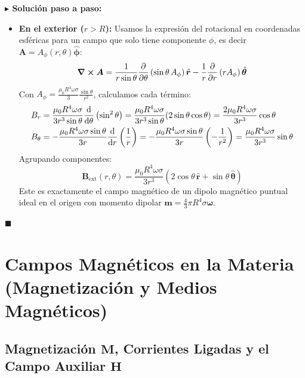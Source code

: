 \documentclass[11pt,a4paper]{book}
\newenvironment{solucion}{%
    \par\medskip\noindent\textbf{\color{blue!65!black}\Large $\blacktriangleright$ Solución paso a paso:}\par\medskip
}{%
    \hfill$\blacksquare$\par\bigskip
}
\newcommand{\rhat}{\hat{\bm{r}}}
\newcommand{\thetahat}{\hat{\bm{\theta}}}
\newcommand{\phihat}{\hat{\bm{\phi}}}
\newcommand{\Bvec}{\bm{B}}
\newcommand{\Hvec}{\bm{H}}
\newcommand{\Mvec}{\bm{M}}
\newcommand{\Avec}{\bm{A}}
\begin{document}
\begin{solucion}
\begin{itemize}
    \item \textbf{En el exterior ($r > R$):} Usamos la expresión del rotacional en coordenadas esféricas para un campo que solo tiene componente $\phi$, es decir $\Avec = A_\phi(r,\theta)\phihat$:
    \begin{equation}
        \curl{\Avec} = \frac{1}{r\sin\theta}\pdv{}{\theta}\left(\sin\theta\,A_\phi\right)\rhat - \frac{1}{r}\pdv{}{r}\left(r A_\phi\right)\thetahat
    \end{equation}
    Con $A_\phi = \frac{\mu_0 R^4 \omega \sigma}{3} \frac{\sin\theta}{r^2}$, calculamos cada término:
    \begin{align}
        B_r &= \frac{\mu_0 R^4 \omega \sigma}{3 r^3 \sin\theta} \dv{}{\theta}\left(\sin^2\theta\right) = \frac{\mu_0 R^4 \omega \sigma}{3 r^3 \sin\theta} (2\sin\theta\cos\theta) = \frac{2\mu_0 R^4 \omega \sigma}{3 r^3}\cos\theta \\
        B_\theta &= -\frac{\mu_0 R^4 \omega \sigma \sin\theta}{3 r} \dv{}{r}\left(\frac{1}{r}\right) = -\frac{\mu_0 R^4 \omega \sigma \sin\theta}{3 r}\left(-\frac{1}{r^2}\right) = \frac{\mu_0 R^4 \omega \sigma}{3 r^3}\sin\theta
    \end{align}
    Agrupando componentes:
    \begin{equation}
        \Bvec_{\text{ext}}(r,\theta) = \frac{\mu_0 R^4 \omega \sigma}{3 r^3}\left(2\cos\theta\,\rhat + \sin\theta\,\thetahat\right)
    \end{equation}
    Este es exactamente el campo magnético de un dipolo magnético puntual ideal en el origen con momento dipolar $\bm{m} = \frac{4}{3}\pi R^4 \sigma \bm{\omega}$.
\end{itemize}
\end{solucion}

\chapter[Campos magnéticos en la materia]{Campos Magnéticos en la Materia (Magnetización y Medios Magnéticos)}

\section[Magnetización y campo auxiliar]{Magnetización \texorpdfstring{$\Mvec$}{M}, Corrientes Ligadas y el Campo Auxiliar \texorpdfstring{$\Hvec$}{H}}
\end{document}
